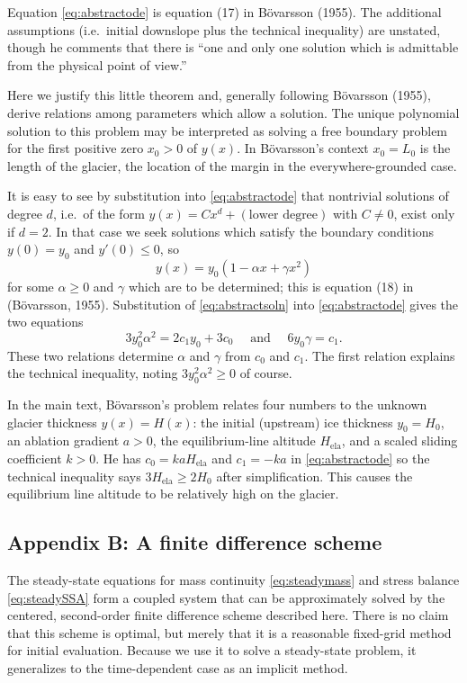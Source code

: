 \documentclass[twocolumn]{igs}
\renewcommand{\dh}{\fontencoding{T1}\selectfont{\symbol{240}}}
\newcommand{\bod}{B\"o\dh varsson\xspace}
\newcommand{\citebod}{B\"o\dh varsson (1955)\nocite{Bodvardsson}\xspace}
\newcommand{\citepbod}{(B\"o\dh varsson, 1955)\nocite{Bodvardsson}\xspace}
\newcommand{\Hela}{H_{\text{ela}}}
\begin{document}
Equation \eqref{eq:abstractode} is equation (17) in \citebod.  The additional assumptions (i.e.~initial downslope plus the technical inequality) are unstated, though he comments that there is ``one and only one solution which is admittable from the physical point of view.''

Here we justify this little theorem and, generally following \citebod, derive relations among parameters which allow a solution.  The unique polynomial solution to this problem may be interpreted as solving a free boundary problem for the first positive zero $x_0>0$ of $y(x)$.  In \bod's context $x_0=L_0$ is the length of the glacier, the location of the margin in the everywhere-grounded case.

It is easy to see by substitution into \eqref{eq:abstractode} that nontrivial solutions of degree $d$, i.e.~of the form $y(x) = C x^d + (\text{lower degree})$ with $C \ne 0$, exist only if $d=2$.  In that case we seek solutions which satisfy the boundary conditions $y(0)=y_0$ and $y'(0) \le 0$, so
\begin{equation}
y(x) = y_0(1 - \alpha x + \gamma x^2)  \label{eq:abstractsoln}
\end{equation}
for some $\alpha\ge 0$ and $\gamma$ which are to be determined; this is equation (18) in \citepbod.  Substitution of \eqref{eq:abstractsoln} into \eqref{eq:abstractode} gives the two equations
\begin{equation}
3 y_0^2 \alpha^2 = 2 c_1 y_0 + 3 c_0 \quad \text{ and } \quad 6 y_0 \gamma = c_1.  \label{eq:abstractrelations}
\end{equation}
These two relations determine $\alpha$ and $\gamma$ from $c_0$ and $c_1$.  The first relation explains the technical inequality, noting $3 y_0^2 \alpha^2 \ge 0$ of course.

In the main text, \bod's problem relates four numbers to the unknown glacier thickness $y(x)=H(x)$: the initial (upstream) ice thickness $y_0=H_0$, an ablation gradient $a>0$, the equilibrium-line altitude $\Hela$, and a scaled sliding coefficient $k>0$.  He has $c_0=k a \Hela$ and $c_1=-ka$ in \eqref{eq:abstractode} so the technical inequality says $3 \Hela \ge 2 H_0$ after simplification.  This causes the equilibrium line altitude to be relatively high on the glacier.


\subsection{Appendix B: A finite difference scheme}  The steady-state equations for mass continuity \eqref{eq:steadymass} and stress balance \eqref{eq:steadySSA} form a coupled system that can be approximately solved by the centered, second-order finite difference scheme described here.  There is no claim that this scheme is optimal, but merely that it is a reasonable fixed-grid method for initial evaluation.  Because we use it to solve a steady-state problem, it generalizes to the time-dependent case as an implicit method.
\end{document}
